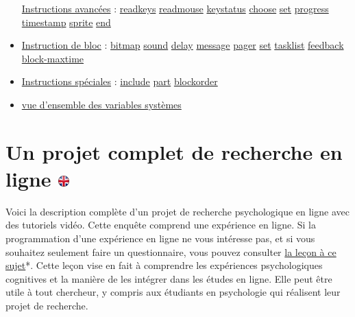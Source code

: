 \documentclass[
]{book}
\begin{document}
\begin{itemize}
  \protect\hyperlink{very_advanced_instructions}{Instructions avancées} : \protect\hyperlink{task-readkeys}{readkeys} \textbar{} \protect\hyperlink{task-readmouse}{readmouse}\textbar{} \protect\hyperlink{task-keystatus}{keystatus} \textbar{} \protect\hyperlink{task-choose}{choose} \textbar{} \protect\hyperlink{task-set}{set} \textbar{} \href{task-progress}{progress} \textbar{} \protect\hyperlink{timestamp}{timestamp} \textbar{} \protect\hyperlink{sprite}{sprite} \textbar{} \protect\hyperlink{end}{end}
\item
  \protect\hyperlink{block}{Instruction de bloc} : \protect\hyperlink{block-bitmap2}{bitmap} \textbar{} \protect\hyperlink{block-sound2}{sound} \textbar{} \protect\hyperlink{block-delay2}{delay} \textbar{} \protect\hyperlink{block-message}{message} \textbar{} \protect\hyperlink{block-pager}{pager} \textbar{} \protect\hyperlink{block-set}{set} \textbar{} \protect\hyperlink{block-tasklist}{tasklist} \textbar{} \protect\hyperlink{block-feedback}{feedback} \textbar{} \protect\hyperlink{block-maxtime}{block-maxtime}
\item
  \protect\hyperlink{s5-13}{Instructions spéciales} : \protect\hyperlink{include}{include} \textbar{} \protect\hyperlink{part}{part} \textbar{} \protect\hyperlink{blockorder}{blockorder}
\item
  \protect\hyperlink{sysvars}{vue d'ensemble des variables systèmes}
\end{itemize}

\hypertarget{un-projet-complet-de-recherche-en-ligne-ukflag}{%
\chapter[Un projet complet de recherche en ligne ]{\texorpdfstring{Un projet complet de recherche en ligne \href{https://www.psytoolkit.org/lessons/project.html}{\protect\includegraphics{img/ukflag.png}}}{Un projet complet de recherche en ligne ukflag}}\label{un-projet-complet-de-recherche-en-ligne-ukflag}}

Voici la description complète d'un projet de recherche psychologique en ligne avec des tutoriels vidéo. Cette enquête comprend une expérience en ligne. Si la programmation d'une expérience en ligne ne vous intéresse pas, et si vous souhaitez seulement faire un questionnaire, vous pouvez consulter \protect\hyperlink{questionnaire-project}{la leçon à ce sujet}*. Cette leçon vise en fait à comprendre les expériences psychologiques cognitives et la manière de les intégrer dans les études en ligne. Elle peut être utile à tout chercheur, y compris aux étudiants en psychologie qui réalisent leur projet de recherche.
\end{document}
